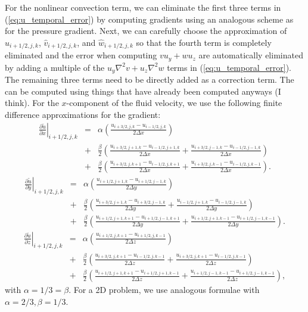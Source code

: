 \documentclass[fleqn,12pt,twoside]{article}
\newcommand{\bea}{\begin{eqnarray}}
\newcommand{\eea}{\end{eqnarray}}
\def\lapl{\ensuremath{\nabla^2}}
\def\px{\partial x}
\def\py{\partial y}
\def\pz{\partial z}
\def\tu{\tilde{u}}
\def\dx{\Delta x}
\def\dy{\Delta y}
\def\dz{\Delta z}
\begin{document}
For the nonlinear convection term, we can eliminate the first three terms in
(\ref{eq:u_temporal_error}) by computing gradients using an analogous scheme 
as for the pressure gradient.  Next, we can carefully choose the approximation 
of $\hat{u}_{i+1/2,j,k}$, $\hat{v}_{i+1/2,j,k}$, and $\hat{w}_{i+1/2,j,k}$ 
so that the fourth term is completely eliminated and the error when computing
$v u_y + w u_z$ are automatically eliminated by adding a multiple of the
$u_y \lapl v + u_z \lapl w$ terms in (\ref{eq:u_temporal_error}).
The remaining three terms need to be directly added as a correction term.  
The can be computed using things that have already been computed anyways (I 
think).  For the $x$-component of the fluid velocity, we use the following 
finite difference approximations for the gradient:
\bea
  \left. \frac{\partial \tu}{\px}\right|_{i+1/2,j,k} &=& 
  \alpha \left(\frac{u_{i+3/2,j,k}-u_{i-1/2,j,k}}{2\dx}\right)
  \nonumber \\
  &+& \frac{\beta}{2} \left( \frac{u_{i+3/2,j+1,k}-u_{i-1/2,j+1,k}}{2\dx} 
                           + \frac{u_{i+3/2,j-1,k}-u_{i-1/2,j-1,k}}{2\dx} 
                      \right)
  \nonumber \\
  &+& \frac{\beta}{2} \left( \frac{u_{i+3/2,j,k+1}-u_{i-1/2,j,k+1}}{2\dx} 
                           + \frac{u_{i+3/2,j,k-1}-u_{i-1/2,j,k-1}}{2\dx} 
                      \right).
\eea
\bea
  \left. \frac{\partial \tu}{\py}\right|_{i+1/2,j,k} &=& 
  \alpha \left(\frac{u_{i+1/2,j+1,k}-u_{i+1/2,j-1,k}}{2\dy}\right)
  \nonumber \\
  &+& \frac{\beta}{2} \left( \frac{u_{i+3/2,j+1,k}-u_{i+3/2,j-1,k}}{2\dy} 
                           + \frac{u_{i-1/2,j+1,k}-u_{i-1/2,j-1,k}}{2\dy} 
                      \right)
  \nonumber \\
  &+& \frac{\beta}{2} \left( \frac{u_{i+1/2,j+1,k+1}-u_{i+1/2,j-1,k+1}}{2\dy} 
                           + \frac{u_{i+1/2,j+1,k-1}-u_{i+1/2,j-1,k-1}}{2\dy} 
                      \right).
\eea
\bea
  \left. \frac{\partial \tu}{\pz}\right|_{i+1/2,j,k} &=& 
  \alpha \left(\frac{u_{i+1/2,j,k+1}-u_{i+1/2,j,k-1}}{2\dz}\right)
  \nonumber \\
  &+& \frac{\beta}{2} \left( \frac{u_{i+3/2,j,k+1}-u_{i-1/2,j,k-1}}{2\dz} 
                           + \frac{u_{i+3/2,j,k+1}-u_{i-1/2,j,k-1}}{2\dz} 
                      \right)
  \nonumber \\
  &+& \frac{\beta}{2} \left( \frac{u_{i+1/2,j+1,k+1}-u_{i+1/2,j+1,k-1}}{2\dz} 
                           + \frac{u_{i+1/2,j-1,k-1}-u_{i+1/2,j-1,k-1}}{2\dz} 
                      \right),
\eea
with $\alpha = 1/3 = \beta$.
For a 2D problem, we use analogous formulae with 
$\alpha = 2/3, \beta = 1/3$.
\end{document}
